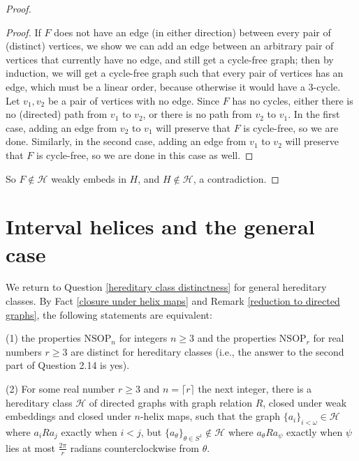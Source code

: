 \documentclass{amsart}
\theoremstyle{definition}
\theoremstyle{remark}
\numberwithin{equation}{section}
\begin{document}
\begin{proof}
\begin{proof}
   If $F$ does not have an edge (in either direction) between every pair of (distinct) vertices, we show we can add an edge between an arbitrary pair of vertices that currently have no edge, and still get a cycle-free graph; then by induction, we will get a cycle-free graph such that every pair of vertices has an edge, which must be a linear order, because otherwise it would have a $3$-cycle. Let $v_{1}, v_{2}$ be a pair of vertices with no edge. Since $F$ has no cycles, either there is no (directed) path from $v_{1}$ to $v_{2}$, or there is no path from $v_{2}$ to $v_{1}$. In the first case, adding an edge from $v_{2}$ to $v_{1}$ will preserve that $F$ is cycle-free, so we are done. Similarly, in the second case, adding an edge from $v_{1}$ to $v_{2}$ will preserve that $F$ is cycle-free, so we are done in this case as well.
\end{proof}

So $F\notin \mathcal{H}$ weakly embeds in $H$, and $H \notin \mathcal{H}$, a contradiction. 


\end{proof}

\section{Interval helices and the general case}

We return to Question \ref{hereditary class distinctness} for general hereditary classes. By Fact \ref{closure under helix maps} and Remark \ref{reduction to directed graphs}, the following statements are equivalent:

(1) the properties $\mathrm{NSOP}_{n}$ for integers $n \geq 3$ and the properties $\mathrm{NSOP}_{r}$ for real numbers $r \geq 3$ are distinct for hereditary classes (i.e., the answer to the second part of Question 2.14 is yes).

(2) For some real number $r \geq 3$ and $n = \lceil r \rceil$ the next integer, there is a hereditary class $\mathcal{H}$ of directed graphs with graph relation $R$, closed under weak embeddings and closed under $n$-helix maps, such that the graph $\{a_{i}\}_{i < \omega} \in \mathcal{H}$ where $a_{i} R a_{j}$ exactly when $i < j$, but $\{a_{\theta}\}_{\theta \in S^{1}} \notin \mathcal{H}$ where $a_{\theta} R a_{\psi}$ exactly when $\psi$ lies at most $\frac{2\pi}{r}$ radians counterclockwise from $\theta$.
\end{document}
